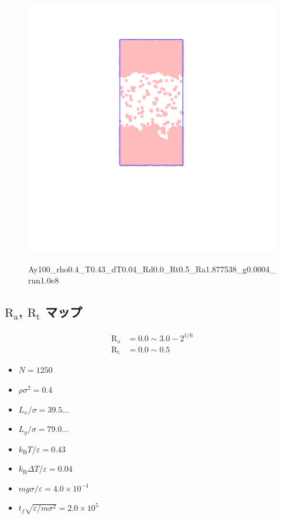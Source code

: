 \begin{figure}[H]
  \centering
  \href{https://youtu.be/CIEyUPvPY6A}{\includegraphics[scale=0.2]{image/2023-11-21T21:01:17.543_followup_chi1.265_Ay100_rho0.4_T0.43_dT0.04_Rd0.0_Rt0.5_Ra1.877538_g0.00019998593898298055_run1.0e8_output.png}}
  \caption{Ay100\_rho0.4\_T0.43\_dT0.04\_Rd0.0\_Rt0.5\_Ra1.877538\_g0.0004\_run1.0e8}
  \label{}
\end{figure}


\subsection{$\text{R}_\text{a}$, $\text{R}_\text{t}$ マップ}

\begin{align}
  \text{R}_\text{a} &= 0.0 \sim 3.0 - 2^{1/6} \\
  \text{R}_\text{t} &= 0.0 \sim 0.5
\end{align}



\begin{itemize}
  \item $N = 1250$
  \item $\rho {\sigma}^2 = 0.4$
  \item $L_x / \sigma = 39.5\dots$
  \item $L_y / \sigma = 79.0\dots$
  \item $k_{\text{B}} T / \varepsilon = 0.43$
  \item $k_{\text{B}} \Delta T / \varepsilon = 0.04$
  \item $mg\sigma/\varepsilon = 4.0 \times 10^{-4}$
  \item $t_f \sqrt{\varepsilon / m \sigma^2} = 2.0 \times 10^{5}$
\end{itemize}

